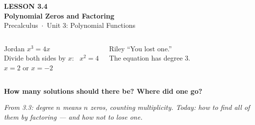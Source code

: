 \documentclass[aspectratio=169, 11pt]{beamer}
\begin{document}
{
\begin{frame}[plain]
  \vspace{2.8cm}\hspace{0.55cm}%
  \begin{minipage}{0.9\textwidth}
    {\color{goldacc}\bfseries\small LESSON 3.4}\\[0.5cm]
    {\color{white}\bfseries\LARGE Polynomial Zeros and Factoring}\\[1.2cm]
    {\color{lilacmid}\small Precalculus~$\cdot$~Unit 3: Polynomial Functions}
  \end{minipage}
\end{frame}
}

\begin{frame}[t, plain]

  \begin{columns}[T]
      \begin{block}{Jordan}
        $x^3 = 4x$\\[3pt]
        Divide both sides by $x$: \ $x^2 = 4$\\[3pt]
        $x = 2$ or $x = -2$
      \end{block}
      \begin{block}{Riley}
        ``You lost one.''\\[3pt]
        The equation has degree 3.
      \end{block}
  \end{columns}

  \bigskip
  \begin{center}
    {\Large\bfseries\color{plum} How many solutions should there be? Where did one go?}
  \end{center}

  \medskip
  \textit{From 3.3: degree $n$ means $n$ zeros, counting multiplicity. Today: how to find all of
  them by factoring --- and how not to lose one.}
\end{frame}
\end{document}
